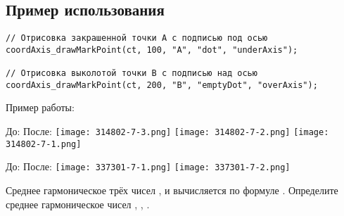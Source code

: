 \subsection{Пример использования}
\begin{verbatim}
// Отрисовка закрашенной точки A с подписью под осью
coordAxis_drawMarkPoint(ct, 100, "A", "dot", "underAxis");

// Отрисовка выколотой точки B с подписью над осью
coordAxis_drawMarkPoint(ct, 200, "B", "emptyDot", "overAxis");
\end{verbatim}

Пример работы:
 
До:
После:
\texttt{[image: 314802-7-3.png]}
\texttt{[image: 314802-7-2.png]}
\texttt{[image: 314802-7-1.png]}

 
До:
После:
\texttt{[image: 337301-7-1.png]}
\texttt{[image: 337301-7-2.png]}




Среднее гармоническое трёх чисел , и вычисляется по формуле . Определите среднее гармоническое чисел , , .




